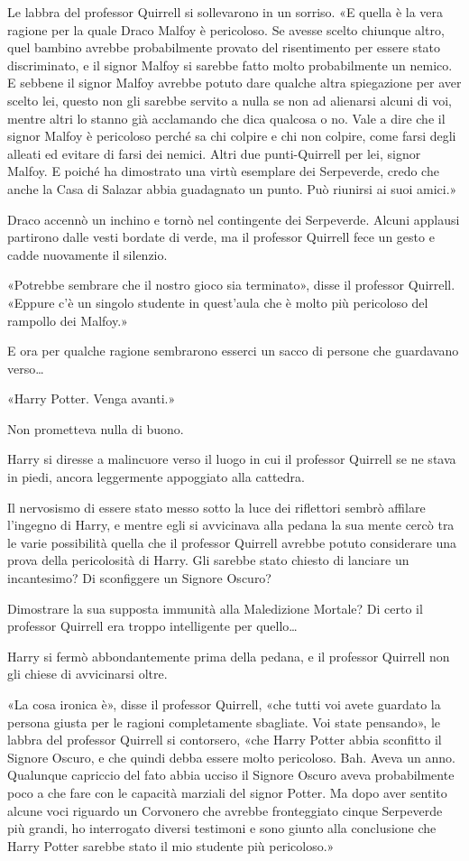Le labbra del professor Quirrell si sollevarono in un sorriso. «E quella è la vera ragione per la quale Draco Malfoy è pericoloso. Se avesse scelto chiunque altro, quel bambino avrebbe probabilmente provato del risentimento per essere stato discriminato, e il signor Malfoy si sarebbe fatto molto probabilmente un nemico. E sebbene il signor Malfoy avrebbe potuto dare qualche altra spiegazione per aver scelto lei, questo non gli sarebbe servito a nulla se non ad alienarsi alcuni di voi, mentre altri lo stanno già acclamando che dica qualcosa o no. Vale a dire che il signor Malfoy è pericoloso perché sa chi colpire e chi non colpire, come farsi degli alleati ed evitare di farsi dei nemici. Altri due punti-Quirrell per lei, signor Malfoy. E poiché ha dimostrato una virtù esemplare dei Serpeverde, credo che anche la Casa di Salazar abbia guadagnato un punto. Può riunirsi ai suoi amici.»

Draco accennò un inchino e tornò nel contingente dei Serpeverde. Alcuni applausi partirono dalle vesti bordate di verde, ma il professor Quirrell fece un gesto e cadde nuovamente il silenzio.

«Potrebbe sembrare che il nostro gioco sia terminato», disse il professor Quirrell. «Eppure c’è un singolo studente in quest’aula che è molto più pericoloso del rampollo dei Malfoy.»

E ora per qualche ragione sembrarono esserci un sacco di persone che guardavano verso…

«Harry Potter. Venga avanti.»

Non prometteva nulla di buono.

Harry si diresse a malincuore verso il luogo in cui il professor Quirrell se ne stava in piedi, ancora leggermente appoggiato alla cattedra.

Il nervosismo di essere stato messo sotto la luce dei riflettori sembrò affilare l’ingegno di Harry, e mentre egli si avvicinava alla pedana la sua mente cercò tra le varie possibilità quella che il professor Quirrell avrebbe potuto considerare una prova della pericolosità di Harry. Gli sarebbe stato chiesto di lanciare un incantesimo? Di sconfiggere un Signore Oscuro?

Dimostrare la sua supposta immunità alla Maledizione Mortale? Di certo il professor Quirrell era troppo intelligente per quello…

Harry si fermò abbondantemente prima della pedana, e il professor Quirrell non gli chiese di avvicinarsi oltre.

«La cosa ironica è», disse il professor Quirrell, «che tutti voi avete guardato la persona giusta per le ragioni completamente sbagliate. Voi state pensando», le labbra del professor Quirrell si contorsero, «che Harry Potter abbia sconfitto il Signore Oscuro, e che quindi debba essere molto pericoloso. Bah. Aveva un anno. Qualunque capriccio del fato abbia ucciso il Signore Oscuro aveva probabilmente poco a che fare con le capacità marziali del signor Potter. Ma dopo aver sentito alcune voci riguardo un Corvonero che avrebbe fronteggiato cinque Serpeverde più grandi, ho interrogato diversi testimoni e sono giunto alla conclusione che Harry Potter sarebbe stato il mio studente più pericoloso.»

